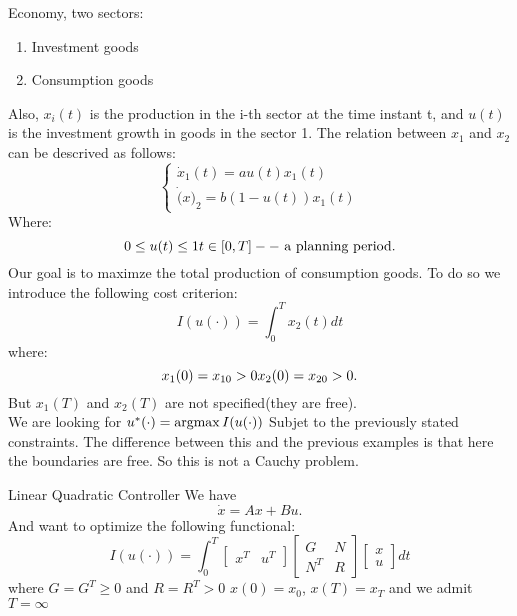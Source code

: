 \ex{}
{
    Economy, two sectors:
    \begin{enumerate}
            \item Investment goods
            \item Consumption goods
    \end{enumerate}
    Also, $x_i(t)$ is the production in the i-th sector at the time instant t,
    and  $u(t)$ is the investment growth in goods in the sector 1.
    The relation between  $x_1$ and $x_2$ can be descrived as follows:
    \begin{equation}
        \begin{cases}
            \dot{x}_1(t) = au(t)x_1(t)\\
            \dot(x)_2 = b(1-u(t))x_1(t)

        \end{cases}
    \end{equation}
    Where:\\
    \[
    0 \le u(t) \le 1\\
    t \in[0,T] -- \text{ a planning period}
    .\] 
    Our goal is to maximze the total production of consumption goods.
    To do so we introduce the following cost criterion:
    \begin{equation}
        I(u(\cdot)) = \int_0^{T}x_2(t)dt
    \end{equation}
    where:
    \[
        x_1(0) = x_{10} > 0\\
        x_2(0) = x_{20} >0
    .\] 
    But $x_1(T)$ and $x_2(T)$ are not specified(they are free).\\
    We are looking for $u^{*}(\cdot) = \operatorname*{arg max}{I(u(\cdot))}$
    Subjet to the previously stated constraints. The difference between this and the previous examples is that here the boundaries are free.
    So this is not a Cauchy problem.
}


\ex
{Linear Quadratic Controller}
{
   We have 
   \[
       \dot{x}=Ax+Bu
   .\] 
   And want to optimize the following functional:
   \begin{equation}
       I(u(\cdot)) = \int_0^{T}\begin{bmatrix}
           x^{T} & u^{T}
       \end{bmatrix}
       \begin{bmatrix}
           G & N \\
           N^{T} & R
       \end{bmatrix}
       \begin{bmatrix}
           x \\
           u
       \end{bmatrix}
       dt
   \end{equation}
   where $G = G^{T} \ge 0$ and $R = R^{T} > 0$ $x(0) = x_0$, $x(T) = x_T$ and we admit  $T = \infty$
}


